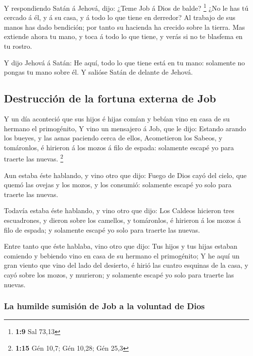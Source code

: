  Y respondiendo Satán á Jehová, dijo: ¿Teme Job á Dios de
balde? \footnote{\textbf{1:9} Sal 73,13}  ¿No le has tú
cercado á él, y á su casa, y á todo lo que tiene en derredor? Al trabajo
de sus manos has dado bendición; por tanto su hacienda ha crecido sobre
la tierra.  Mas extiende ahora tu mano, y toca á todo lo
que tiene, y verás si no te blasfema en tu rostro.

 Y dijo Jehová á Satán: He aquí, todo lo que tiene está en
tu mano: solamente no pongas tu mano sobre él. Y salióse Satán de
delante de Jehová.

\hypertarget{destrucciuxf3n-de-la-fortuna-externa-de-job}{%
\subsection{Destrucción de la fortuna externa de
Job}\label{destrucciuxf3n-de-la-fortuna-externa-de-job}}

 Y un día aconteció que sus hijos é hijas comían y bebían
vino en casa de su hermano el primogénito,  Y vino un
mensajero á Job, que le dijo: Estando arando los bueyes, y las asnas
paciendo cerca de ellos,  Acometieron los Sabeos, y
tomáronlos, é hirieron á los mozos á filo de espada: solamente escapé yo
para traerte las nuevas. \footnote{\textbf{1:15} Gén 10,7; Gén 10,28;
  Gén 25,3}

 Aun estaba éste hablando, y vino otro que dijo: Fuego de
Dios cayó del cielo, que quemó las ovejas y los mozos, y los consumió:
solamente escapé yo solo para traerte las nuevas.

 Todavía estaba éste hablando, y vino otro que dijo: Los
Caldeos hicieron tres escuadrones, y dieron sobre los camellos, y
tomáronlos, é hirieron á los mozos á filo de espada; y solamente escapé
yo solo para traerte las nuevas.

 Entre tanto que éste hablaba, vino otro que dijo: Tus
hijos y tus hijas estaban comiendo y bebiendo vino en casa de su hermano
el primogénito;  Y he aquí un gran viento que vino del lado
del desierto, é hirió las cuatro esquinas de la casa, y cayó sobre los
mozos, y murieron; y solamente escapé yo solo para traerte las nuevas.

\hypertarget{la-humilde-sumisiuxf3n-de-job-a-la-voluntad-de-dios}{%
\subsubsection{La humilde sumisión de Job a la voluntad de
Dios}\label{la-humilde-sumisiuxf3n-de-job-a-la-voluntad-de-dios}}

